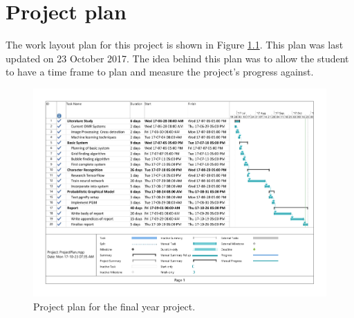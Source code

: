 \chapter{Project plan}
\label{ap:ProjectPlan}
\graphicspath{{Appendix1/Appendix1figures/}}
The work layout plan for this project is shown in Figure \ref{fig:ProjectPlan}. This plan was last updated on 23 October 2017. The idea behind this plan was to allow the student to have a time frame to plan and measure the project's progress against.

\begin{figure}
\centering
\includegraphics[scale=0.55, trim=35 58.5 35 35, clip, angle=90]{ProjectPlan}
\caption{Project plan for the final year project.}
\label{fig:ProjectPlan}
\end{figure}